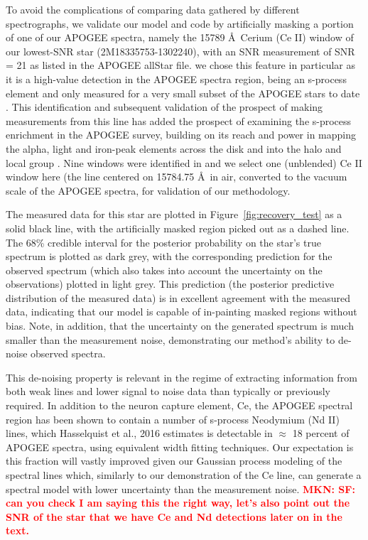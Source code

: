 \documentclass[a4paper,fleqn,usenatbib]{mnras}
\newcommand{\mkn}[1]{\textbf{\textcolor{red}{MKN: #1}}}
\begin{document}
To avoid the complications of comparing data gathered by different spectrographs, we validate our model and code by artificially masking a portion of one of our APOGEE spectra, namely the 15789 \AA\ Cerium (Ce II) window of our lowest-SNR star (2M18335753-1302240), with an SNR measurement of SNR = 21 as listed in the APOGEE allStar file. we chose this feature in particular as it is a high-value detection in the APOGEE spectra region, being an s-process element and only measured for a very small subset of the APOGEE stars to date \citep{Cunha2017}. This identification \citep{Cunha2017} and subsequent validation of the prospect of making measurements from this line has added the prospect of examining the s-process enrichment in the APOGEE survey, building on its reach and power in mapping the alpha, light and iron-peak elements across the disk and into the halo and local group \citep[e.g.][]{Majewski2017, Nideer2014, Hayden2015, Weinberg2019}. Nine windows were identified in \citet{Cunha2017} and we select one (unblended) Ce II window here (the line centered on 15784.75 \AA\ in air, converted to the vacuum scale of the APOGEE spectra, for validation of our methodology. 


The measured data for this star are plotted in Figure~\ref{fig:recovery_test} as a solid black line, with the artificially masked region picked out as a dashed line. The 68\% credible interval for the posterior probability on the star's true spectrum is plotted as dark grey, with the corresponding prediction for the observed spectrum (which also takes into account the uncertainty on the observations) plotted in light grey. This prediction (the posterior predictive distribution of the measured data) is in excellent agreement with the measured data, indicating that our model is capable of in-painting masked regions without bias. Note, in addition, that the uncertainty on the generated spectrum is much smaller than the measurement noise, demonstrating our method's ability to de-noise observed spectra.

This de-noising property is relevant in the regime of extracting information from both weak lines and lower signal to noise data than typically or previously required. In addition to the neuron capture element, Ce, the APOGEE spectral region has been shown to contain a number of s-process Neodymium (Nd II) lines, which Hasselquist et al., 2016 estimates is detectable in $\approx$ 18 percent of APOGEE spectra, using equivalent width fitting techniques. Our expectation is this fraction will vastly improved given our Gaussian process modeling of the spectral lines which, similarly to our demonstration of the Ce line, can generate a spectral model with lower uncertainty than the measurement noise. \mkn{SF: can you check I am saying this the right way, let's also point out the SNR of the star that we have Ce and Nd detections later on in the text.}
\end{document}

